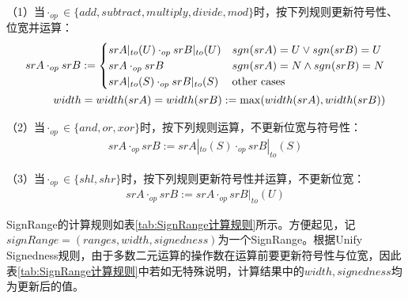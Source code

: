（1）当$ \cdot_{op} \in \{add, subtract, multiply, divide, mod\} $时，按下列规则更新符号性、位宽并运算：
\begin{align}{\label{align:Unify规则}}
	srA \cdot_{op} srB := \begin{cases}
		srA |_{to}(U) \cdot_{op} srB |_{to}(U) & sgn(srA) = U \lor sgn(srB) = U\\
		srA \cdot_{op} srB & sgn(srA) = N \land sgn(srB) = N\\
		srA |_{to}(S) \cdot_{op} srB |_{to}(S) & \text{other cases}
	\end{cases}\\
		width = width(srA) = width(srB) := \max(width(srA), width(srB)) 
\end{align}

（2）当$ \cdot_{op} \in \{and, or, xor\} $时，按下列规则运算，不更新位宽与符号性：
\begin{align}
	srA \cdot_{op} srB := srA |_{to}(S) \cdot_{op} srB |_{to}(S)
\end{align}

（3）当$ \cdot_{op} \in \{shl, shr\} $时，按下列规则更新符号性并运算，不更新位宽：
\begin{align}
	srA \cdot_{op} srB := srA \cdot_{op} srB |_{to}(U)
\end{align}

SignRange的计算规则如表\ref{tab:SignRange计算规则}所示。方便起见，记$ signRange = (ranges, width, signedness) $为一个SignRange。根据Unify Signedness规则，由于多数二元运算的操作数在运算前要更新符号性与位宽，因此表\ref{tab:SignRange计算规则}中若如无特殊说明，计算结果中的$ width, signedness $均为更新后的值。


